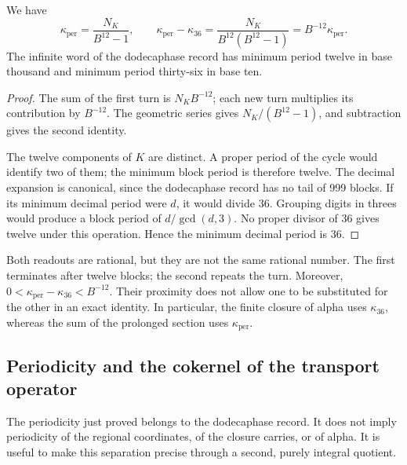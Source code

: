 \begin{proposition}
\label{prop:k-periodo}
We have
\begin{equation}
 \kappa_{\mathrm{per}}=\frac{N_K}{B^{12}-1},\qquad
 \kappa_{\mathrm{per}}-\kappa_{36}
 =\frac{N_K}{B^{12}(B^{12}-1)}
 =B^{-12}\kappa_{\mathrm{per}}.
 \label{eq:k-diferencia-kappas}
\end{equation}
The infinite word of the dodecaphase record has minimum period twelve in base thousand and
minimum period thirty-six in base ten.
\end{proposition}

\begin{proof}
The sum of the first turn is \(N_KB^{-12}\); each new turn
multiplies its contribution by \(B^{-12}\). The geometric series gives
\(N_K/(B^{12}-1)\), and subtraction gives the second identity.

The twelve components of \(K\) are distinct. A proper period of the cycle
would identify two of them; the minimum block period is therefore
twelve. The decimal expansion is canonical, since the dodecaphase record has no tail
of 999 blocks. If its minimum decimal period were \(d\), it would divide
36. Grouping digits in threes would produce a block period of
\(d/\gcd(d,3)\). No proper divisor of 36 gives twelve under this
operation. Hence the minimum decimal period is 36.
\end{proof}

Both readouts are rational, but they are not the same rational number. The first
terminates after twelve blocks; the second repeats the turn. Moreover,
\(0<\kappa_{\mathrm{per}}-\kappa_{36}<B^{-12}\). Their proximity does not
allow one to be substituted for the other in an exact identity. In particular,
the finite closure of alpha uses \(\kappa_{36}\), whereas the
sum of the prolonged section uses \(\kappa_{\mathrm{per}}\).



\subsection{Periodicity and the cokernel of the transport operator}
\label{subsec:k-clase-acarreo}

The periodicity just proved belongs to the dodecaphase record. It does not imply
periodicity of the regional coordinates, of the closure carries,
or of alpha. It is useful to make this separation precise through a second,
purely integral quotient.

